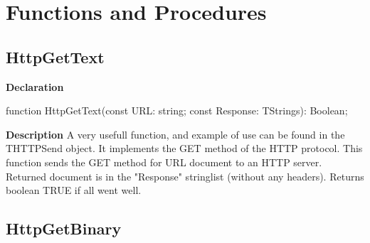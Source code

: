 \documentclass{report}
\newif\ifpdf
\begin{document}
\section{Functions and Procedures}
\ifpdf
\subsection*{\large{\textbf{HttpGetText}}\normalsize\hspace{1ex}\hrulefill}
\else
\subsection*{HttpGetText}
\fi
\label{httpsend-HttpGetText}
\begin{list}{}{
\setlength{\itemindent}{0cm}
\setlength{\listparindent}{0cm}
\setlength{\leftmargin}{\evensidemargin}
\addtolength{\leftmargin}{\tmplength}
\settowidth{\labelsep}{X}
\addtolength{\leftmargin}{\labelsep}
\setlength{\labelwidth}{\tmplength}
}
\item[\textbf{Declaration}\hfill]
\ifpdf
\begin{flushleft}
\fi
\begin{ttfamily}
function HttpGetText(const URL: string; const Response: TStrings): Boolean;\end{ttfamily}

\ifpdf
\end{flushleft}
\fi

\par
\item[\textbf{Description}]
A very usefull function, and example of use can be found in the THTTPSend object. It implements the GET method of the HTTP protocol. This function sends the GET method for URL document to an HTTP server. Returned document is in the "Response" stringlist (without any headers). Returns boolean TRUE if all went well.

\end{list}
\ifpdf
\subsection*{\large{\textbf{HttpGetBinary}}\normalsize\hspace{1ex}\hrulefill}
\else
\end{document}
